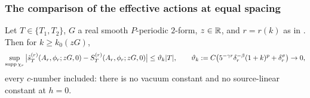 
\subsubsection*{The comparison of the effective actions at equal spacing}

\begin{theorem}\label{rot:thm:A}
Let $T\in\{T_1,T_2\}$, $G$ a real smooth $P$-periodic $2$-form, $z\in\mathbb R$, and $r=r(k)$ as in . Then for $k\ge k_0(zG)$,
\[
\sup_{\operatorname{supp}\chi_r}\big|\hat s^{(r)}_T(A_r,\phi_r;zG,0)-S^{(r)}_T(A_r,\phi_r;zG,0)\big|\le\vartheta_k|T|,\qquad
\vartheta_k:= C\big(5^{-\gamma r}\delta_r^{-\beta}(1+k)^p+\delta_r^\sigma\big)\to0,
\]
every $c$-number included: there is no vacuum constant and no source-linear constant at $h=0$.
\end{theorem}

